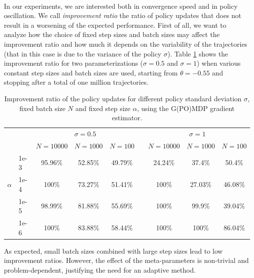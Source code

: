 \paragraph{}
In our experiments, we are interested both in convergence speed and in policy oscillation. We call \textit{improvement ratio} the ratio of policy updates that does not result in a worsening of the expected performance. First of all, we want to analyze how the choice of fixed step sizes and batch sizes may affect the improvement ratio and how much it depends on the variability of the trajectories (that in this case is due to the variance of the policy $\sigma$).
Table \ref{tab:1} shows the improvement ratio for two parameterizations ($\sigma=0.5$ and $\sigma=1$) when various constant step sizes and batch sizes are used, starting from $\theta=-0.55$ and stopping after a total of one million trajectories. 

\begin{table}[H]
\caption[Improvement ratio of the policy updates for different parametrizations of the LQG task.]{Improvement ratio of the policy updates for different policy standard deviation $\sigma$, fixed batch size $N$ and fixed step size $\alpha$, using the G(PO)MDP gradient estimator.}
\label{tab:1}
\centering
\begin{adjustbox}{width=1.0\linewidth,center}
\begin{tabular}{@{}llccccccc@{}} 
\toprule
\phantom{abc} & \phantom{abc} & \multicolumn{3}{c}{$\sigma=0.5$} & \phantom{abc} & \multicolumn{3}{c}{$\sigma=1$} \\
\cmidrule{3-5} \cmidrule{7-9}
\phantom{abc} & \phantom{abc} & $N=10000$ & $N=1000$ & $N=100$ & \phantom{abc} & $N=10000$ & $N=1000$ & $N=100$
\\\cmidrule{3-9}
\phantom{abc} & 1e-3 & 95.96\% & 52.85\% & 49.79\% & \phantom{abc} & 24.24\% & 37.4\% & 50.4\% \\ 
 $\alpha$	  & 1e-4 & 100\% & 73.27\% & 51.41\% & \phantom{abc} & 100\% & 27.03\% & 46.08\% \\
\phantom{abc} & 1e-5 & 98.99\% & 81.88\% & 55.69\% & \phantom{abc} & 100\% & 99.9\% & 39.04\%\\
\phantom{abc} & 1e-6 & 100\% & 83.88\% & 58.44\% & \phantom{abc} & 100\% & 100\% & 86.04\% \\
\bottomrule
\end{tabular}
\end{adjustbox}
\end{table}

As expected, small batch sizes combined with large step sizes lead to low improvement ratios. However, the effect of the meta-parameters is non-trivial and problem-dependent, justifying the need for an adaptive method.  
